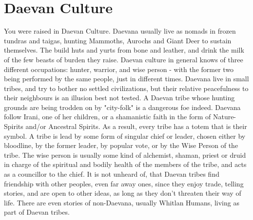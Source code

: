 \section{Daevan Culture}\label{culture:daevan}
You were raised in Daevan Culture.
Daevana usually live as nomads in frozen tundras and taigas, hunting Mammoths, Aurochs and Giant Deer to sustain themselves.
The build huts and yurts from bone and leather, and drink the milk of the few beasts of burden they raise.
Daevan culture in general knows of three different occupations: hunter, warrior, and wise person - with the former two being performed by the same people, just in different times.
Daevana live in small tribes, and try to bother no settled civilizations, but their relative peacefulness to their neighbours is an illusion best not tested.
A Daevan tribe whose hunting grounds are being trodden on by "city-folk" is a dangerous foe indeed.
Daevana follow Irani, one of her children, or a shamanistic faith in the form of Nature-Spirits and/or Ancestral Spirits.
As a result, every tribe has a totem that is their symbol.
A tribe is lead by some form of singular chief or leader, chosen either by bloodline, by the former leader, by popular vote, or by the Wise Person of the tribe.
The wise person is usually some kind of alchemist, shaman, priest or druid in charge of the spiritual and bodily health of the members of the tribe, and acts as a councillor to the chief.
It is not unheard of, that Daevan tribes find friendship with other peoples, even far away ones, since they enjoy trade, telling stories, and are open to other ideas, as long as they don't threaten their way of life.
There are even stories of non-Daevana, usually Whitlan Humans, living as part of Daevan tribes.